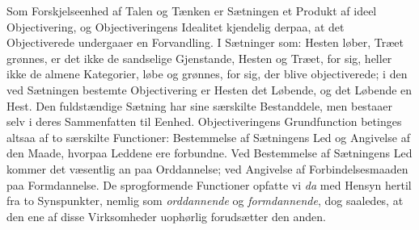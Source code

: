 \documentclass[12pt]{book}
\newcommand{\opage}[1]{\marginnote{\footnotesize\textit{[#1]}}}
\begin{document}
\opage{30}Som Forskjelseenhed af Talen og Tænken er Sætningen
et Produkt af ideel Objectivering, og Objectiveringens Idealitet
kjendelig derpaa, at det Objectiverede undergaaer en Forvandling.
I Sætninger som: Hesten løber, Træet grønnes, er det ikke
de sandselige Gjenstande, Hesten og Træet, for sig, heller ikke
de almene Kategorier, løbe og grønnes, for sig, der blive objectiverede;
i den ved Sætningen bestemte Objectivering er
Hesten det Løbende, og det Løbende en Hest. Den fuldstændige
Sætning har sine særskilte Bestanddele, men bestaaer selv
i deres Sammenfatten til Eenhed. Objectiveringens Grundfunction
betinges altsaa af to særskilte Functioner: Bestemmelse
af Sætningens Led og Angivelse af den Maade, hvorpaa
Leddene ere forbundne. Ved Bestemmelse af Sætningens
Led kommer det væsentlig an paa Orddannelse; ved Angivelse
af Forbindelsesmaaden paa Formdannelse. De sprogformende
Functioner opfatte vi \emph{da} med Hensyn hertil fra to Synspunkter,
nemlig som \emph{orddannende} og \emph{formdannende},
dog saaledes, at den ene af disse Virksomheder uophørlig forudsætter
den anden.
\end{document}
